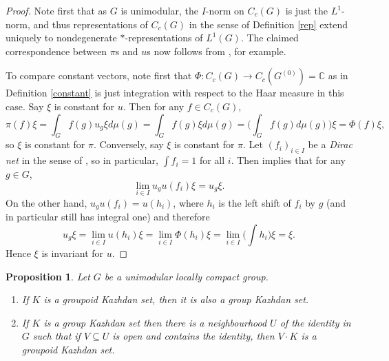 \documentclass{article}
\newcommand{\C}{\mathbb{C}}
\theoremstyle{plain}
\newtheorem{proposition}[theorem]{Proposition}
\theoremstyle{definition}
\theoremstyle{remark}
\begin{document}
\begin{proof}
Note first that as $G$ is unimodular, the $I$-norm on $C_c(G)$ is just the $L^1$-norm, and thus representations of $C_c(G)$ in the sense of Definition \ref{rep} extend uniquely to nondegenerate $*$-representations of $L^1(G)$.  The claimed correspondence between $\pi$s and $u$s now follows from \cite[Section 6.2]{Echterhoff:2009qd}, for example.

To compare constant vectors, note first that $\Phi:C_c(G)\to C_c(G^{(0)})=\C$ as in Definition \ref{constant} is just integration with respect to the Haar measure in this case.  Say $\xi$ is constant for $u$.  Then for any $f\in C_c(G)$,
$$
\pi(f)\xi=\int_G f(g)  u_g\xi d\mu(g)=\int_G f(g)\xi d\mu(g)=\Big(\int_G f(g)d\mu(g)\Big)\xi=\Phi(f)\xi,
$$
so $\xi$ is constant for $\pi$.  Conversely, say $\xi$ is constant for $\pi$.   Let $(f_i)_{i\in I}$ be a \emph{Dirac net} in the sense of \cite[page 28]{Echterhoff:2009qd}, so in particular, $\int f_i=1$ for all $i$.  Then \cite[Lemma 6.2.2]{Echterhoff:2009qd} implies that for any $g\in G$, 
$$
\lim_{i\in I}u_gu(f_i) \xi=u_g\xi.
$$
On the other hand, $u_gu(f_i)=u(h_i)$, where $h_i$ is the left shift of $f_i$ by $g$ (and in particular still has integral one) and therefore 
$$
u_g\xi=\lim_{i\in I}u(h_i)\xi=\lim_{i\in I} \Phi(h_i)\xi=\lim_{i\in I} \Big(\int h_i\Big)\xi=\xi.
$$
Hence $\xi$ is invariant for $u$.
\end{proof}

\begin{proposition}\label{2kaz}
Let $G$ be a unimodular locally compact group.  
\begin{enumerate}
\item If $K$ is a groupoid Kazhdan set, then it is also a group Kazhdan set.
\item If $K$ is a group Kazhdan set then there is a neighbourhood $U$ of the identity in $G$ such that if $V\subseteq U$ is open and contains the identity, then $V\cdot K$ is a groupoid Kazhdan set. 
\end{enumerate}
\end{proposition}
\end{document}
